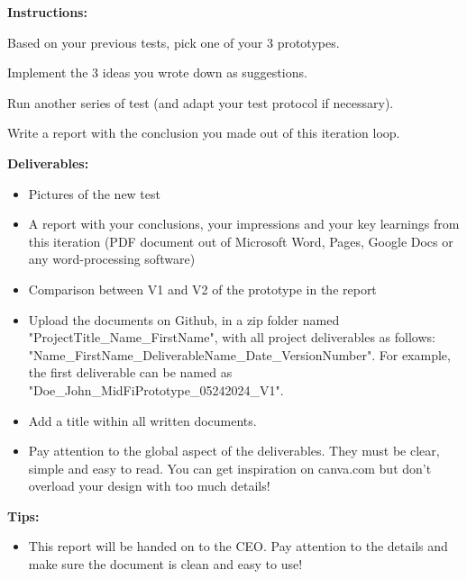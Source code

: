 \makeheaderfiles

\textbf{Instructions:}

Based on your previous tests, pick one of your 3 prototypes.

Implement the 3 ideas you wrote down as suggestions.

Run another series of test (and adapt your test protocol if necessary).

Write a report with the conclusion you made out of this iteration loop.

\textbf{Deliverables:}

\begin{itemize}
\item Pictures of the new test
\item A report with your conclusions, your impressions and your key learnings from this iteration (PDF document out of Microsoft Word, Pages, Google Docs or any word-processing software)
\item Comparison between V1 and V2 of the prototype in the report
\item Upload the documents on Github, in a zip folder named "ProjectTitle\_Name\_FirstName", with all project deliverables as follows: "Name\_FirstName\_DeliverableName\_Date\_VersionNumber".  For example, the first deliverable can be named as "Doe\_John\_MidFiPrototype\_05242024\_V1".
\item Add a title within all written documents.
\item Pay attention to the global aspect of the deliverables. They must be clear, simple and easy to read. You can get inspiration on canva.com but don't overload your design with too much details!
\end{itemize}

\textbf{Tips:}

\begin{itemize}
\item This report will be handed on to the CEO. Pay attention to the details and make sure the document is clean and easy to use!
\end{itemize}

